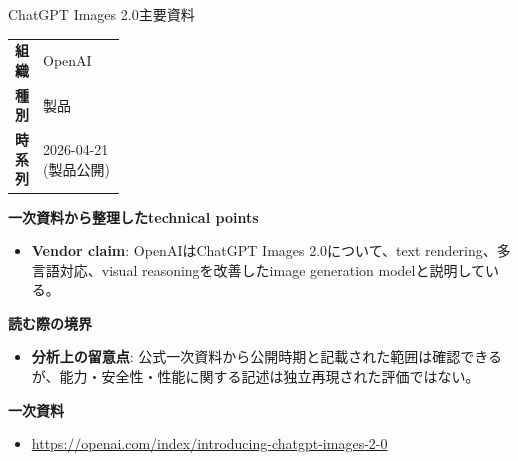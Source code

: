 \begin{technicalnote}{ChatGPT Images 2.0}{主要資料}
\begingroup
\begin{tabularx}{\linewidth}{@{}>{\bfseries}p{0.22\linewidth}X@{}}
組織 & OpenAI \\
種別 & 製品 \\
時系列 & 2026-04-21 (製品公開) \\
\end{tabularx}
\smallskip
{\bfseries 一次資料から整理したtechnical points}
\begin{itemize}[leftmargin=1.5em,itemsep=0.35em]
\item \textbf{Vendor claim}: OpenAIはChatGPT Images 2.0について、text rendering、多言語対応、visual reasoningを改善したimage generation modelと説明している。
\end{itemize}
{\bfseries 読む際の境界}
\begin{itemize}[leftmargin=1.5em,itemsep=0.35em]
\item \textbf{分析上の留意点}: 公式一次資料から公開時期と記載された範囲は確認できるが、能力・安全性・性能に関する記述は独立再現された評価ではない。
\end{itemize}
\begin{samepage}
{\bfseries 一次資料}
\begingroup\sloppy
\begin{itemize}[leftmargin=1.5em,itemsep=0.25em]
\item {\scriptsize\url{https://openai.com/index/introducing-chatgpt-images-2-0}}
\end{itemize}
\endgroup
\end{samepage}
\endgroup
\end{technicalnote}
\medskip

